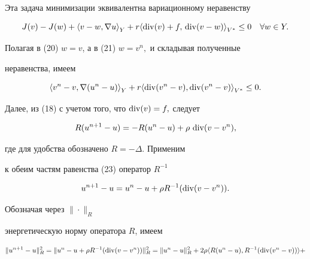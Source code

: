 \begin{pf}
Эта задача минимизации эквивалентна вариационному неравенству


\begin{equation}


J(v) - J(w) + {\langle v-w,\nabla u \rangle}_{Y} +


r {\langle \Div (v) + f,\, \Div (v- w) \rangle}_{V^{*}} \le 0


\quad \forall w \in Y.


\end{equation}


 


Полагая в (20) $w = v$, а в (21) $ w = v^{n},$ и складывая полученные


неравенства, имеем


\begin{equation}


{\langle v^{n} - v,\nabla (u^{n}-u) \rangle}_{Y}


+ r {\langle \Div(v^{n} - v), \Div(v^{n}-v) \rangle}_{V^{*}} \le 0.


\end{equation}


Далее, из (18) с учетом того, что $\operatorname{div}(v) = f,$ следует


\begin{equation}


R(u^{n+1}-u) = -R(u^{n} - u) + \rho \, \Div (v-v^{n}),


\end{equation}


где для удобства обозначено $R = -\Delta$. Применим 


к обеим частям равенства (23) оператор $R^{-1}$


$$


u^{n+1}-u = u^{n} - u + \rho R^{-1}(\Div(v-v^{n})).


$$


Обозначая через $\|\cdot\|_{R}$ 


энергетическую норму оператора $R$, имеем


\begin{multline*}


\|u^{n+1}-u\|^2_R = \|u^{n} - u + \rho R^{-1}(\Div(v-v^{n}))\|^{2}_{R}=


\|u^{n}-u\|^{2}_{R} + 


2 \rho {\langle R(u^{n}-u),R^{-1}(\Div(v^{n}-v)) \rangle} + \\


%



\end{multline*}
\end{pf}
